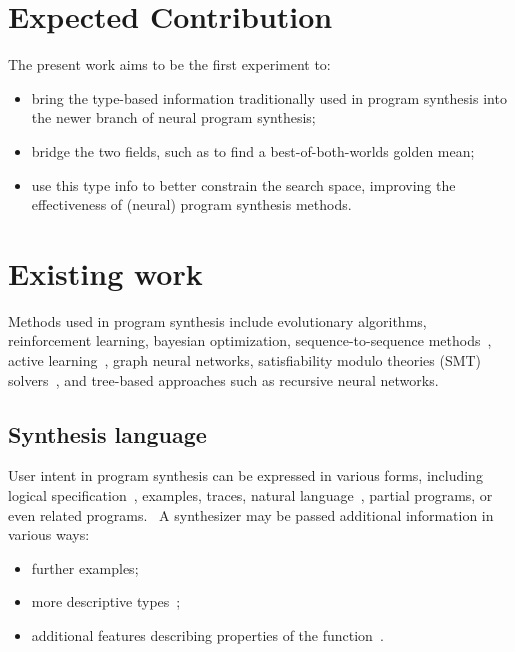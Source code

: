 \documentclass{article}
\begin{document}
\section{Expected Contribution}\label{sec:expected-contribution}

The present work aims to be the first experiment to:
\begin{itemize}
    \item bring the type-based information traditionally used in program synthesis into the newer branch of neural program synthesis;
    \item bridge the two fields, such as to find a best-of-both-worlds golden mean;
    \item use this type info to better constrain the search space, improving the effectiveness of (neural) program synthesis methods. 
\end{itemize}

\section{Existing work}\label{sec:existing-work}



Methods used in program synthesis include evolutionary algorithms, reinforcement learning, bayesian optimization, sequence-to-sequence methods~\citep{neuralmachinetranslation}, active learning~\citep{shen2019using}, graph neural networks, satisfiability modulo theories (SMT) solvers~\citep{rosette,hornclauses,architecture}, and tree-based approaches such as recursive neural networks.


\subsection{Synthesis language}

User intent in program synthesis can be expressed in various forms, including logical specification~\citep{temporalstreamlogic},
examples, traces, natural language~\citep{abstractsyntaxnetworks}, partial programs, or even related programs.~\citep{gulwani2017program}
A synthesizer may be passed additional information in various ways:
\begin{itemize}
    \item further examples;
    \item more descriptive types~\citep{synquid};
    \item additional features describing properties of the function~\citep{odena2020learning}.
\end{itemize}
\end{document}

